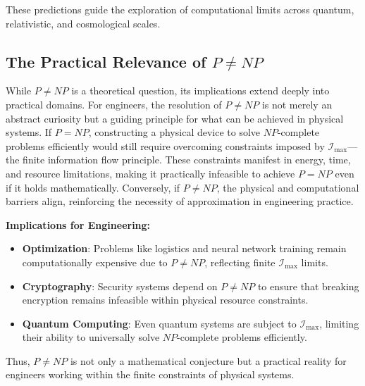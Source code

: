 \documentclass[12pt]{article}
\begin{document}
These predictions guide the exploration of computational limits across quantum, relativistic, and cosmological scales.


\subsection{The Practical Relevance of \(P \neq NP\)}
While \(P \neq NP\) is a theoretical question, its implications extend deeply into practical domains. For engineers, the resolution of \(P \neq NP\) is not merely an abstract curiosity but a guiding principle for what can be achieved in physical systems. If \(P = NP\), constructing a physical device to solve \(NP\)-complete problems efficiently would still require overcoming constraints imposed by \(\mathcal{I}_{\text{max}}\)—the finite information flow principle. These constraints manifest in energy, time, and resource limitations, making it practically infeasible to achieve \(P = NP\) even if it holds mathematically. Conversely, if \(P \neq NP\), the physical and computational barriers align, reinforcing the necessity of approximation in engineering practice.

\textbf{Implications for Engineering:}
\begin{itemize}
    \item \textbf{Optimization}: Problems like logistics and neural network training remain computationally expensive due to \(P \neq NP\), reflecting finite \(\mathcal{I}_{\text{max}}\) limits.
    \item \textbf{Cryptography}: Security systems depend on \(P \neq NP\) to ensure that breaking encryption remains infeasible within physical resource constraints.
    \item \textbf{Quantum Computing}: Even quantum systems are subject to \(\mathcal{I}_{\text{max}}\), limiting their ability to universally solve \(NP\)-complete problems efficiently.
\end{itemize}

Thus, \(P \neq NP\) is not only a mathematical conjecture but a practical reality for engineers working within the finite constraints of physical systems.
\end{document}
